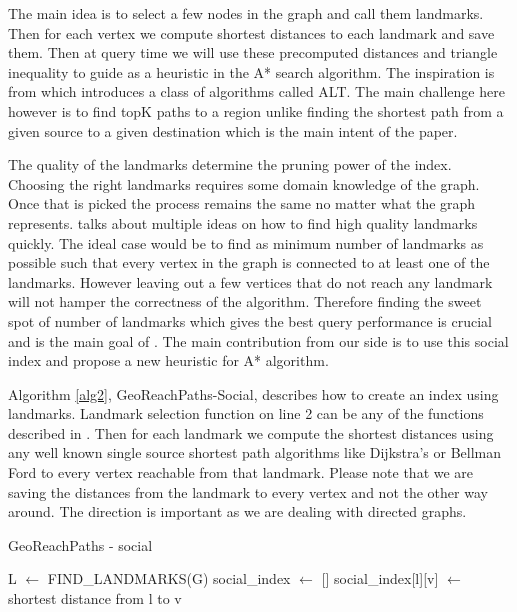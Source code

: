 {The main idea is to select a few nodes in the graph and call them landmarks. Then for each vertex we compute shortest distances to each landmark and save them. Then at query time we will use these precomputed distances and triangle inequality to guide as a heuristic in the A* search algorithm. The inspiration is from \cite{AC2005} which introduces a class of algorithms called ALT. The main challenge here however is to find topK paths to a region unlike finding the shortest path from a given source to a given destination which is the main intent of the paper.

The quality of the landmarks determine the pruning power of the index. Choosing the right landmarks requires some domain knowledge of the graph. Once that is picked the process remains the same no matter what the graph represents. \cite{AC2005} talks about multiple ideas on how to find high quality landmarks quickly. The ideal case would be to find as minimum number of landmarks as possible such that every vertex in the graph is connected to at least one of the landmarks.  However leaving out a few vertices that do not reach any landmark will not hamper the correctness of the algorithm. Therefore finding the sweet spot of number of landmarks which gives the best query performance is crucial and is the main goal of \cite{AC2005}. The main contribution from our side is to use this social index and propose a new heuristic for A* algorithm.

Algorithm \ref{alg2}, GeoReachPaths-Social, describes how to create an index using landmarks. Landmark selection function on line 2 can be any of the functions described in \cite{AC2005}. Then for each landmark we compute the shortest distances using any well known single source shortest path algorithms like Dijkstra's or Bellman Ford to every vertex reachable from that landmark. Please note that we are saving the distances from the landmark to every vertex and not the other way around. The direction is important as we are dealing with directed graphs.\\

\begin{algorithm}[t]
\caption{GeoReachPaths - social}
\begin{scriptsize}
\label{alg2}
\begin{algorithmic}[1]

  \State L $\gets$ FIND\_LANDMARKS(G) 
  \State social\_index $\gets$ []
	  	\State social\_index[l][v] $\gets $ shortest distance from l to v
	\EndFor
  \EndFor
\EndFunction
\end{algorithmic}


\end{scriptsize}
\end{algorithm}}
